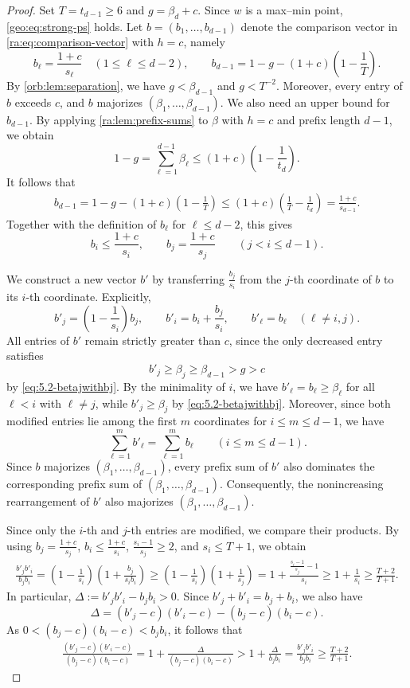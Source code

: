 \documentclass[reqno, 11pt]{article}
\numberwithin{equation}{section}
\theoremstyle{definition}
\begin{document}
\begin{proof}
Set $T=t_{d-1}\ge6$ and $g=\beta_d+c$. Since $w$ is a max--min point, \eqref{geo:eq:strong-ps} holds. Let $b=(b_1,\ldots,b_{d-1})$ denote the comparison vector in \eqref{ra:eq:comparison-vector} with $h=c$, namely
\[
b_\ell=\frac{1+c}{s_\ell}\quad(1\le\ell\le d-2),
\qquad
b_{d-1}=1-g-(1+c)\left(1-\frac1T\right).
\]
By \cref{orb:lem:separation}, we have $g<\beta_{d-1}$ and $g<T^{-2}$. Moreover, every entry of $b$ exceeds $c$, and $b$ majorizes $(\beta_1,\ldots,\beta_{d-1})$.
We also need an  upper bound for $b_{d-1}$. By applying \cref{ra:lem:prefix-sums}
to $\beta$ with $h=c$ and prefix length $d-1$, we obtain
\[
1-g=\sum_{\ell=1}^{d-1}\beta_\ell
\le (1+c)\left(1-\frac1{t_d}\right).
\]
It follows that
\[
\begin{aligned}
b_{d-1}=1-g-(1+c)\left(1-\frac1T\right)\le (1+c)\left(\frac1T-\frac1{t_d}\right)
=\frac{1+c}{s_{d-1}}.
\end{aligned}
\]
Together with the definition of $b_\ell$ for $\ell\le d-2$, this gives 
\[
b_i\le\frac{1+c}{s_i},
\qquad
b_j=\frac{1+c}{s_j}
\qquad(j<i\le d-1).
\]

We construct a new vector $b'$ by transferring $\frac{b_j}{s_i}$ from the $j$-th coordinate of $b$ to its $i$-th coordinate. Explicitly,
\[
b'_j=\left(1-\frac1{s_i}\right)b_j,\qquad
b'_i=b_i+\frac{b_j}{s_i},\qquad
b'_\ell=b_\ell\quad(\ell\ne i,j).
\]
All entries of $b'$ remain strictly greater than $c$, since the only decreased entry satisfies
\[
b'_j\ge\beta_j\ge\beta_{d-1}>g>c
\]
by \eqref{eq:5.2-betajwithbj}.
By the minimality of $i$, we have $b'_\ell=b_\ell\ge\beta_\ell$ for all $\ell<i$ with $\ell\ne j$, while $b'_j\ge\beta_j$ by \eqref{eq:5.2-betajwithbj}. Moreover, since both modified entries lie among the first $m$ coordinates for $i\le m\le d-1$, we have
\[
\sum_{\ell=1}^{m}b'_\ell
=\sum_{\ell=1}^{m}b_\ell
\qquad(i\le m\le d-1).
\]
Since $b$ majorizes $(\beta_1,\ldots,\beta_{d-1})$, every prefix sum of $b'$ also dominates the corresponding prefix sum of $(\beta_1,\ldots,\beta_{d-1})$. Consequently, the nonincreasing rearrangement of $b'$ also majorizes $(\beta_1,\ldots,\beta_{d-1})$.


Since only the $i$-th and $j$-th entries are modified, we compare their products. By using $b_j=\frac{1+c}{s_j}$, $b_i\le\frac{1+c}{s_i}$, $\frac{s_i-1}{s_j}\ge2$, and $s_i\le T+1$, we obtain
\[
\begin{aligned}
 \frac{b'_jb'_i}{b_jb_i}=\left(1-\frac1{s_i}\right)\left(1+\frac{b_j}{s_ib_i}\right)\ge\left(1-\frac1{s_i}\right)\left(1+\frac1{s_j}\right)
 =1+\frac{\frac{s_i-1}{s_j}-1}{s_i}
 \ge1+\frac1{s_i}\ge\frac{T+2}{T+1}.
\end{aligned}
\]
In particular, $\Delta:=b'_jb'_i-b_jb_i>0$. Since $b'_j+b'_i=b_j+b_i$,
we also have
\[
\Delta=(b'_j-c)(b'_i-c)-(b_j-c)(b_i-c).
\]
As $0<(b_j-c)(b_i-c)<b_jb_i$, it follows that
\[
\begin{aligned}
\frac{(b'_j-c)(b'_i-c)}
     {(b_j-c)(b_i-c)}=1+\frac{\Delta}{(b_j-c)(b_i-c)}>1+\frac{\Delta}{b_jb_i}=\frac{b'_jb'_i}{b_jb_i}
\ge\frac{T+2}{T+1}.
\end{aligned}
\]



\end{proof}
\end{document}
